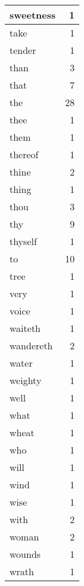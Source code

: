 \begin{center}
\begin{longtable}{l|r}
sweetness & 1\\ \hline 
take & 1\\ \hline 
tender & 1\\ \hline 
than & 3\\ \hline 
that & 7\\ \hline 
the & 28\\ \hline 
thee & 1\\ \hline 
them & 1\\ \hline 
thereof & 1\\ \hline 
thine & 2\\ \hline 
thing & 1\\ \hline 
thou & 3\\ \hline 
thy & 9\\ \hline 
thyself & 1\\ \hline 
to & 10\\ \hline 
tree & 1\\ \hline 
very & 1\\ \hline 
voice & 1\\ \hline 
waiteth & 1\\ \hline 
wandereth & 2\\ \hline 
water & 1\\ \hline 
weighty & 1\\ \hline 
well & 1\\ \hline 
what & 1\\ \hline 
wheat & 1\\ \hline 
who & 1\\ \hline 
will & 1\\ \hline 
wind & 1\\ \hline 
wise & 1\\ \hline 
with & 2\\ \hline 
woman & 2\\ \hline 
wounds & 1\\ \hline 
wrath & 1\\ \hline 
\end{longtable}  
\end{center}  


  
\normalsize  

  
  
